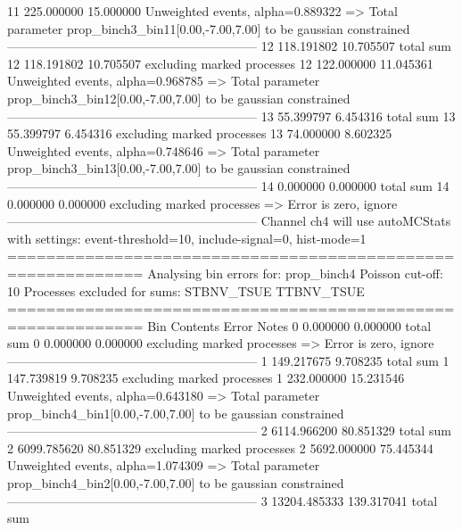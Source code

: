 11         225.000000      15.000000       Unweighted events, alpha=0.889322
  => Total parameter prop_binch3_bin11[0.00,-7.00,7.00] to be gaussian constrained
------------------------------------------------------------
12         118.191802      10.705507       total sum                     
12         118.191802      10.705507       excluding marked processes    
12         122.000000      11.045361       Unweighted events, alpha=0.968785
  => Total parameter prop_binch3_bin12[0.00,-7.00,7.00] to be gaussian constrained
------------------------------------------------------------
13         55.399797       6.454316        total sum                     
13         55.399797       6.454316        excluding marked processes    
13         74.000000       8.602325        Unweighted events, alpha=0.748646
  => Total parameter prop_binch3_bin13[0.00,-7.00,7.00] to be gaussian constrained
------------------------------------------------------------
14         0.000000        0.000000        total sum                     
14         0.000000        0.000000        excluding marked processes    
  => Error is zero, ignore      
------------------------------------------------------------
Channel ch4 will use autoMCStats with settings: event-threshold=10, include-signal=0, hist-mode=1
============================================================
Analysing bin errors for: prop_binch4
Poisson cut-off: 10
Processes excluded for sums: STBNV_TSUE TTBNV_TSUE
============================================================
Bin        Contents        Error           Notes                         
0          0.000000        0.000000        total sum                     
0          0.000000        0.000000        excluding marked processes    
  => Error is zero, ignore      
------------------------------------------------------------
1          149.217675      9.708235        total sum                     
1          147.739819      9.708235        excluding marked processes    
1          232.000000      15.231546       Unweighted events, alpha=0.643180
  => Total parameter prop_binch4_bin1[0.00,-7.00,7.00] to be gaussian constrained
------------------------------------------------------------
2          6114.966200     80.851329       total sum                     
2          6099.785620     80.851329       excluding marked processes    
2          5692.000000     75.445344       Unweighted events, alpha=1.074309
  => Total parameter prop_binch4_bin2[0.00,-7.00,7.00] to be gaussian constrained
------------------------------------------------------------
3          13204.485333    139.317041      total sum                     
